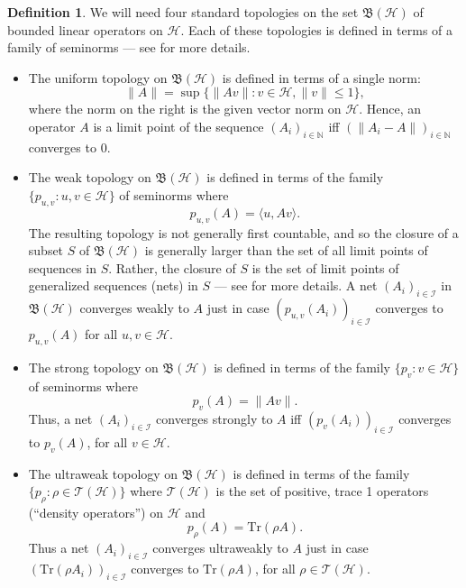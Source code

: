 \documentclass[11pt]{article}
\newcommand{\norm}[1]{\| #1\|}
\newcommand{\bh}{\mathfrak{B}(\mathcal{H})}
\theoremstyle{definition}
\theoremstyle{definition}
\newtheorem{defn}[thm]{Definition}
\theoremstyle{remark}
\def\2#1{{\mathcal #1}}
\def\7#1{{\mathbb #1}}
\begin{document}
\begin{defn} We will need four standard topologies on the set $\bh$ of bounded linear
  operators on $\2H$.  Each of these topologies is defined in terms of a family of
  seminorms --- see \cite[Chaps.\ 1,5]{kr} for more details.
\begin{itemize}
\item The uniform topology on $\bh$ is defined in terms of a single norm:
$$ \norm{A} =\sup \{ \norm{Av}:v\in \2H ,\norm{v}\leq 1 \} ,$$
where the norm on the right is the given vector norm on $\2H$.  Hence, an operator
$A$ is a limit point of the sequence $(A_i)_{i\in \7N}$ iff $(\norm{A_i-A})_{i\in
  \7N}$ converges to $0$.
\item The weak topology on $\bh$ is defined in terms of the family $\{ p_{u,v}:u,v\in
  \2H \}$ of seminorms where
$$ p_{u,v}(A)=\langle u,Av\rangle .$$
The resulting topology is not generally first countable, and so the closure of a
subset $S$ of $\bh$ is generally larger than the set of all limit points of sequences
in $S$.  Rather, the closure of $S$ is the set of limit points of generalized
sequences (nets) in $S$ --- see \cite[Chap.\ 1]{kr} for more details.  A net
$(A_i)_{i\in \2I}$ in $\bh$ converges weakly to $A$ just in case
$(p_{u,v}(A_i))_{i\in \2I}$ converges to $p_{u,v}(A)$ for all $u,v\in \2H$.
\item The strong topology on $\bh$ is defined in terms of the family $\{ p_v :v\in
  \2H \}$ of seminorms where
$$ p_v(A) =\norm{Av} .$$
Thus, a net $(A_i)_{i\in \2I}$ converges strongly to $A$ iff $(p_v(A_i))_{i\in \2I}$
converges to $p_v(A)$, for all $v\in \2H$.
\item The ultraweak topology on $\bh$ is defined in terms of the family $\{ p_{\rho}
  :\rho \in \2T (\2H ) \}$ where $\2T (\2H )$ is the set of positive, trace 1
  operators (``density operators'') on $\2H$ and 
$$ p_\rho (A)=\mathrm{Tr} (\rho A) .$$
Thus a net $(A_i)_{i\in \2I}$ converges ultraweakly to $A$ just in case
$(\mathrm{Tr}(\rho A_i))_{i\in \2I}$ converges to $\mathrm{Tr}(\rho A)$, for all
$\rho \in \2T (\2H )$.
\end{itemize}
\end{defn}
\end{document}
